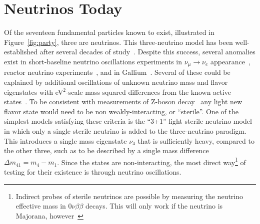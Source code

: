 \documentclass[main.tex]{subfiles}
\begin{document}
\section{Neutrinos Today}

Of the seventeen fundamental particles known to exist, illustrated in Figure~\ref{fig:party}, three are neutrinos. 
This three-neutrino model has been well-established after several decades of study~\cite{PhysRevD.98.030001,Esteban_2019,de_Salas_2018,Capozzi_2016,zboson2006, berns2021recent}.
Despite this success, several anomalies exist in short-baseline neutrino oscillations experiments in $\nu_{\mu}\to\nu_{e}$ appearance~\cite{aguilar2018significant}, reactor neutrino experiments~\cite{mention2011reactor,serebrov2019first}, and in Gallium~\cite{PhysRevC.73.045805,giunti2011statistical}. 
Several of these could be explained by additional oscillations of unknown neutrino mass and flavor eigenstates with eV$^{2}$-scale mass squared differences from the known active states~\cite{abazajian2012light}. 
To be consistent with measurements of Z-boson decay~\cite{zboson2006} any light new flavor state would need to be non weakly-interacting, or ``sterile''. 
One of the simplest models satisfying these criteria is the ``3+1'' light sterile neutrino model in which only a single sterile neutrino is added to the three-neutrino paradigm. 
This introduces a single mass eigenstate $\nu_{4}$ that is sufficiently heavy, compared to the other three, such as to be described by a single mass difference $\Delta m_{41}=m_{4}-m_{1}$. 
Since the states are non-interacting, the most direct way\footnote{Indirect probes of sterile neutrinos are possible by measuring the neutrino effective mass in $0\nu\beta\beta$ decays. This will only work if the neutrino is Majorana, however~\cite{HUANG2019114691}} of testing for their existence is through neutrino oscillations. 
\end{document}
